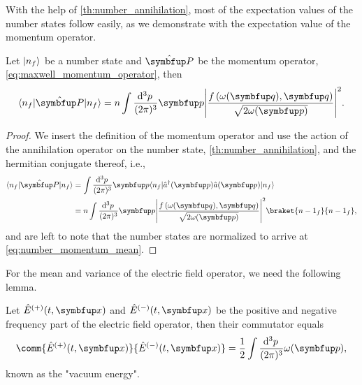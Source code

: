 With the help of \cref{th:number_annihilation}, most of the expectation values of the number states follow easily, as we demonstrate with the expectation value of the momentum operator.
\begin{theorem}
	Let $\lvert n_f\rangle$ be a number state and $\vu{P}$ be the momentum operator, \cref{eq:maxwell_momentum_operator}, then
	\begin{equation}
		\bra{n_f}
		\vu{P}
		\ket{n_f}
		=
		n
		\int\frac{\dd[3]{p}}{(2\pi)^3}
		\vb{p}
		\abs*{\frac{f\left(\omega(\vb{q}),\vb{q}\right)}{\sqrt{2\omega(\vb{p})}}}^2
		\label{eq:number_momentum_mean}
		.
	\end{equation}
\end{theorem}
\begin{proof}
	We insert the definition of the momentum operator and use the action of the annihilation operator on the number state, \cref{th:number_annihilation}, and the hermitian conjugate thereof, i.e.,
	\begin{equation}
		\begin{split}
			\bra{n_f}
			\vu{P}
			\ket{n_f}
			&=
			\int\frac{\dd[3]{p}}{(2\pi)^3}
			\vb{p}
			\bra{n_f}
			\hat{a}^\dagger(\vb{p})
			\hat{a}(\vb{p})
			\ket{n_f}
			\\
			&=
			n
			\int\frac{\dd[3]{p}}{(2\pi)^3}
			\vb{p}
			\abs*{\frac{f\left(\omega(\vb{q}),\vb{q}\right)}{\sqrt{2\omega(\vb{p})}}}^2
			\braket{{n-1}_f}{{n-1}_f}
			,
		\end{split}
	\end{equation}
	and are left to note that the number states are normalized to arrive at \cref{eq:number_momentum_mean}.
\end{proof}
For the mean and variance of the electric field operator, we need the following lemma.
\begin{lemma}\label{th:comm_electric_field_equal}
	Let $\hat{E}^{(+)}(t,\vb{x})$ and $\hat{E}^{(-)}(t,\vb{x})$ be the positive and negative frequency part of the electric field operator, then their commutator equals
	\begin{equation}
		\comm{\hat{E}^{(+)}(t,\vb{x})}{\hat{E}^{(-)}(t,\vb{x})}
		=
		\frac{1}{2}
		\int\frac{\dd[3]{p}}{(2\pi)^3}
		\omega(\vb{p})
		,
	\end{equation}
	known as the "vacuum energy".
\end{lemma}
